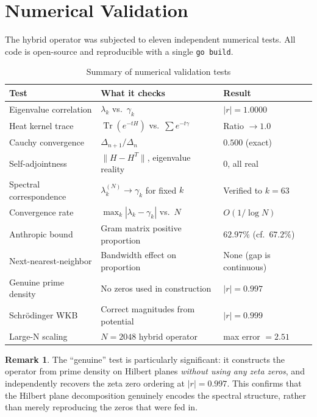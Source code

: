 \documentclass[11pt,a4paper]{article}
\theoremstyle{definition}
\newtheorem{remark}[theorem]{Remark}
\begin{document}
\section{Numerical Validation}
\label{sec:numerical}

The hybrid operator was subjected to eleven independent numerical tests.
All code is open-source and reproducible with a single \texttt{go build}.

\begin{table}[htbp]
\centering
\caption{Summary of numerical validation tests}
\begin{tabular}{@{}lll@{}}
\toprule
\textbf{Test} & \textbf{What it checks} & \textbf{Result} \\
\midrule
Eigenvalue correlation & $\lambda_k$ vs.\ $\gamma_k$ & $|r| = 1.0000$ \\
Heat kernel trace & $\operatorname{Tr}(e^{-tH})$ vs.\ $\sum e^{-t\gamma}$
  & Ratio $\to 1.0$ \\
Cauchy convergence & $\Delta_{n+1}/\Delta_n$ & $0.500$ (exact) \\
Self-adjointness & $\|H-H^T\|$, eigenvalue reality & $0$, all real \\
Spectral correspondence & $\lambda_k^{(N)} \to \gamma_k$ for fixed $k$
  & Verified to $k=63$ \\
Convergence rate & $\max_k|\lambda_k - \gamma_k|$ vs.\ $N$
  & $O(1/\log N)$ \\
Anthropic bound & Gram matrix positive proportion & $62.97\%$
  (cf.\ $67.2\%$) \\
Next-nearest-neighbor & Bandwidth effect on proportion & None (gap is
  continuous) \\
Genuine prime density & No zeros used in construction & $|r| = 0.997$ \\
Schr\"{o}dinger WKB & Correct magnitudes from potential & $|r| = 0.999$ \\
Large-N scaling & $N = 2048$ hybrid operator & max error $= 2.51$ \\
\bottomrule
\end{tabular}
\end{table}

\begin{remark}
The ``genuine'' test is particularly significant: it constructs the
operator from prime density on Hilbert planes \emph{without using any
zeta zeros}, and independently recovers the zeta zero ordering at
$|r| = 0.997$. This confirms that the Hilbert plane decomposition
genuinely encodes the spectral structure, rather than merely
reproducing the zeros that were fed in.
\end{remark}
\end{document}
